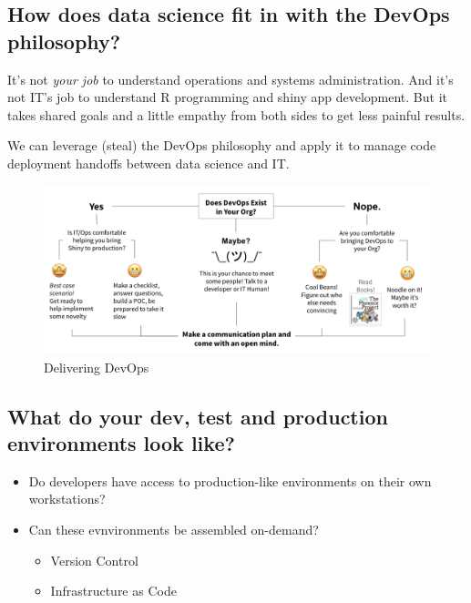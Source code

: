 \documentclass[]{book}
\providecommand{\tightlist}{%
  \setlength{\itemsep}{0pt}\setlength{\parskip}{0pt}}
\theoremstyle{definition}
\theoremstyle{definition}
\theoremstyle{definition}
\theoremstyle{remark}
\begin{document}
\hypertarget{how-does-data-science-fit-in-with-the-devops-philosophy}{%
\subsection{How does data science fit in with the DevOps
philosophy?}\label{how-does-data-science-fit-in-with-the-devops-philosophy}}

It's not \emph{your job} to understand operations and systems
administration. And it's not IT's job to understand R programming and
shiny app development. But it takes shared goals and a little empathy
from both sides to get less painful results.

We can leverage (steal) the DevOps philosophy and apply it to manage
code deployment handoffs between data science and IT.

\begin{figure}
\centering
\includegraphics{imgs/devops/devops-flowchart.png}
\caption{Delivering DevOps}
\end{figure}

\hypertarget{what-do-your-dev-test-and-production-environments-look-like}{%
\subsection{What do your dev, test and production environments look
like?}\label{what-do-your-dev-test-and-production-environments-look-like}}

\begin{itemize}
\tightlist
\item
  Do developers have access to production-like environments on their own
  workstations?
\item
  Can these evnvironments be assembled on-demand?

  \begin{itemize}
  \tightlist
  \item
    Version Control
  \item
    Infrastructure as Code
  \end{itemize}
\end{itemize}
\end{document}
